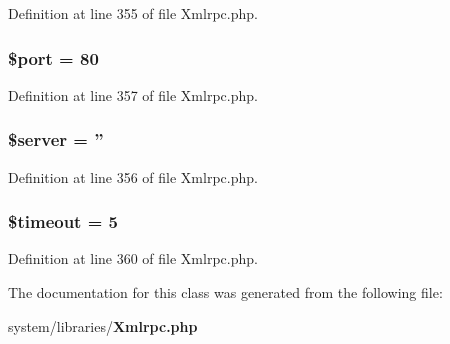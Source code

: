 Definition at line 355 of file Xmlrpc.\-php.

\subsubsection[{\$port}]{\setlength{\rightskip}{0pt plus 5cm}\$port = 80}\label{class_x_m_l___r_p_c___client_aa0787efab4b22e8a212882f3409d4c77}


Definition at line 357 of file Xmlrpc.\-php.

\subsubsection[{\$server}]{\setlength{\rightskip}{0pt plus 5cm}\${\bf server} = ''}\label{class_x_m_l___r_p_c___client_ad135cc8a47e55f0829949cf62214170f}


Definition at line 356 of file Xmlrpc.\-php.

\subsubsection[{\$timeout}]{\setlength{\rightskip}{0pt plus 5cm}\${\bf timeout} = 5}\label{class_x_m_l___r_p_c___client_a84320a9bf3e591d7ae20dfcb0dfe6a0d}


Definition at line 360 of file Xmlrpc.\-php.



The documentation for this class was generated from the following file\-:\begin{DoxyCompactItemize}
\item 
system/libraries/{\bf Xmlrpc.\-php}\end{DoxyCompactItemize}
